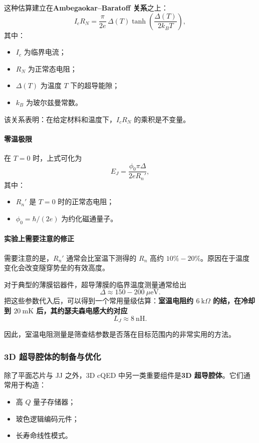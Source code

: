 \documentclass[12pt,a4paper,oneside]{ctexbook}
\begin{document}
这种估算建立在\textbf{Ambegaokar--Baratoff 关系}之上：
\begin{equation}
I_cR_N=\frac{\pi}{2e}\,\Delta(T)\tanh\!\left(\frac{\Delta(T)}{2k_BT}\right),
\tag{41}
\end{equation}
其中：
\begin{itemize}
    \item \(I_c\) 为临界电流；
    \item \(R_N\) 为正常态电阻；
    \item \(\Delta(T)\) 为温度 \(T\) 下的超导能隙；
    \item \(k_B\) 为玻尔兹曼常数。
\end{itemize}

该关系表明：在给定材料和温度下，\(I_cR_N\) 的乘积是不变量。

\paragraph{零温极限}
在 \(T=0\) 时，上式可化为
\begin{equation}
E_J=\frac{\phi_0 \pi \Delta}{2eR_n'},
\tag{42}
\end{equation}
其中：
\begin{itemize}
    \item \(R_n'\) 是 \(T=0\) 时的正常态电阻；
    \item \(\phi_0=\hbar/(2e)\) 为约化磁通量子。
\end{itemize}

\paragraph{实验上需要注意的修正}
需要注意的是，\(R_n'\) 通常会比室温下测得的 \(R_n\) 高约 \(10\%\!-\!20\%\)。原因在于温度变化会改变隧穿势垒的有效高度。

对于典型的薄膜铝器件，超导薄膜的临界温度测量通常给出
\[
\Delta \approx 150\!-\!200~\mu\mathrm{eV}.
\]
把这些参数代入后，可以得到一个常用量级估算：\textbf{室温电阻约 \(6~\mathrm{k}\Omega\) 的结，在冷却到 \(20~\mathrm{mK}\) 后，其约瑟夫森电感大约对应}
\[
L_J \approx 8~\mathrm{nH}.
\]

因此，室温电阻测量是筛查结参数是否落在目标范围内的非常实用的方法。

\subsubsection{3D 超导腔体的制备与优化}

除了平面芯片与 JJ 之外，3D cQED 中另一类重要组件是\textbf{3D 超导腔体}。它们通常用于构造：
\begin{itemize}
    \item 高 \(Q\) 量子存储器；
    \item 玻色逻辑编码元件；
    \item 长寿命线性模式。
\end{itemize}
\end{document}
